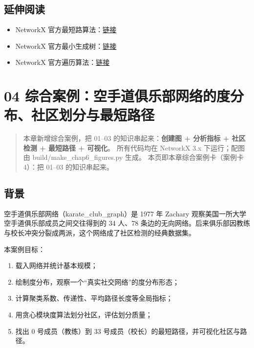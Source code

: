 \subsection{延伸阅读}\label{ux5ef6ux4f38ux9605ux8bfb-28}

\begin{itemize}
\tightlist
\item
  NetworkX
  官方最短路算法：\href{https://networkx.org/documentation/stable/reference/algorithms/shortest_paths.html}{链接}
\item
  NetworkX
  官方最小生成树：\href{https://networkx.org/documentation/stable/reference/algorithms/mst.html}{链接}
\item
  NetworkX
  官方遍历算法：\href{https://networkx.org/documentation/stable/reference/algorithms/traversal.html}{链接}
\end{itemize}

\section{04
综合案例：空手道俱乐部网络的度分布、社区划分与最短路径}\label{ux7efcux5408ux6848ux4f8bux7a7aux624bux9053ux4ff1ux4e50ux90e8ux7f51ux7edcux7684ux5ea6ux5206ux5e03ux793eux533aux5212ux5206ux4e0eux6700ux77edux8defux5f84}

\begin{quote}
本章新增综合案例，把 01--03 的知识串起来：\textbf{创建图 + 分析指标 +
社区检测 + 最短路径 + 可视化}。 所有代码均在 NetworkX 3.x 下运行；配图由
build/make\_chap6\_figures.py 生成。 本页即本章综合案例卡（案例卡
4）：把 01--03 的知识串起来。
\end{quote}

\subsection{背景}\label{ux80ccux666f-5}

空手道俱乐部网络（karate\_club\_graph）是 1977 年 Zachary
观察美国一所大学空手道俱乐部成员之间交往得到的 34 人、78
条边的无向网络。后来俱乐部因教练与校长冲突分裂成两派，这个网络成了社区检测的经典数据集。

本案例目标：

\begin{enumerate}
\def\labelenumi{\arabic{enumi}.}
\tightlist
\item
  载入网络并统计基本规模；
\item
  绘制度分布，观察一个``真实社交网络''的度分布形态；
\item
  计算聚类系数、传递性、平均路径长度等全局指标；
\item
  用贪心模块度算法划分社区，评估划分质量；
\item
  找出 0 号成员（教练）到 33
  号成员（校长）的最短路径，并可视化社区与路径。
\end{enumerate}

